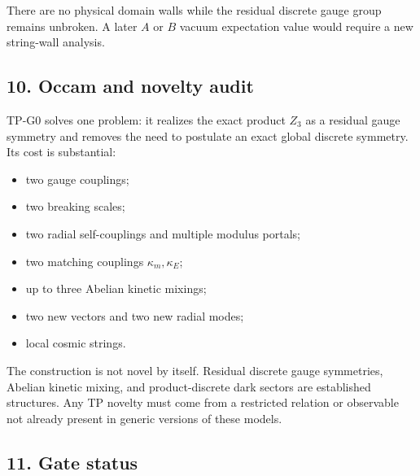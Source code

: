 \documentclass[
]{article}
\providecommand{\tightlist}{%
  \setlength{\itemsep}{0pt}\setlength{\parskip}{0pt}}
\begin{document}
There are no physical domain walls while the residual discrete gauge
group remains unbroken. A later \(A\) or \(B\) vacuum expectation value
would require a new string-wall analysis.

\hypertarget{occam-and-novelty-audit}{%
\subsection{10. Occam and novelty audit}\label{occam-and-novelty-audit}}

TP-G0 solves one problem: it realizes the exact product \(Z_3\) as a
residual gauge symmetry and removes the need to postulate an exact
global discrete symmetry. Its cost is substantial:

\begin{itemize}
\tightlist
\item
  two gauge couplings;
\item
  two breaking scales;
\item
  two radial self-couplings and multiple modulus portals;
\item
  two matching couplings \(\kappa_m,\kappa_E\);
\item
  up to three Abelian kinetic mixings;
\item
  two new vectors and two new radial modes;
\item
  local cosmic strings.
\end{itemize}

The construction is not novel by itself. Residual discrete gauge
symmetries, Abelian kinetic mixing, and product-discrete dark sectors
are established structures. Any TP novelty must come from a restricted
relation or observable not already present in generic versions of these
models.

\hypertarget{gate-status}{%
\subsection{11. Gate status}\label{gate-status}}
\end{document}
